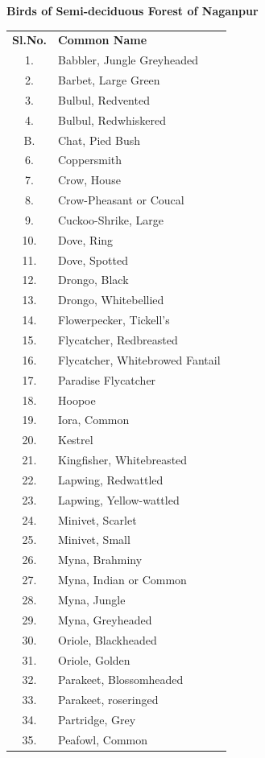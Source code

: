\begin{center}
\smallskip
\textbf{Birds of Semi-deciduous Forest of Naganpur}
\end{center}
\begin{longtable}{cl}
\textbf{Sl.No.} & \textbf{Common Name}\\
1. & Babbler, Jungle Greyheaded \\
2. & Barbet, Large Green \\
3. & Bulbul, Redvented \\
4. & Bulbul, Redwhiskered\\ 
B. & Chat, Pied Bush \\
6. & Coppersmith \\
7. &Crow, House \\
8. &Crow-Pheasant or Coucal \\
9. &Cuckoo-Shrike, Large \\
10.& Dove, Ring \\
11.& Dove, Spotted\\ 
12.& Drongo, Black \\
13.& Drongo, Whitebellied \\
14.& Flowerpecker, Tickell's \\
15.& Flycatcher, Redbreasted \\
16.& Flycatcher, Whitebrowed Fantail \\
17.& Paradise Flycatcher \\
18.& Hoopoe \\
19.& Iora, Common \\
20.& Kestrel \\
21.& Kingfisher, Whitebreasted \\
22.& Lapwing, Redwattled \\
23.& Lapwing, Yellow-wattled \\
24.& Minivet, Scarlet \\
25.& Minivet, Small \\
26.& Myna, Brahminy \\
27.& Myna, Indian or Common \\
28.& Myna, Jungle \\
29.& Myna, Greyheaded \\
30. &Oriole, Blackheaded \\
31. &Oriole, Golden \\
32. &Parakeet, Blossomheaded \\
33. &Parakeet, roseringed \\
34. &Partridge, Grey \\
35. &Peafowl, Common \\

\end{longtable}
